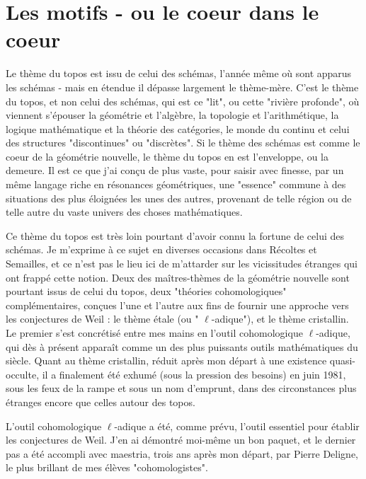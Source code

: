\section{Les motifs - ou le coeur dans le coeur}

Le thème du topos est issu de celui des schémas, l'année même où sont apparus les schémas - mais en étendue il dépasse largement le thème-mère. C'est le thème du topos, et non celui des schémas, qui est ce "lit", ou cette "rivière profonde", où viennent s'épouser la géométrie et l'algèbre, la topologie et l'arithmétique, la logique mathématique et la théorie des catégories, le monde du continu et celui des structures "discontinues" ou "discrètes". Si le thème des schémas est comme le coeur de la géométrie nouvelle, le thème du topos en est l'enveloppe, ou la demeure. Il est ce que j'ai conçu de plus vaste, pour saisir avec finesse, par un même langage riche en résonances géométriques, une "essence" commune à des situations des plus éloignées les unes des autres, provenant de telle région ou de telle autre du vaste univers des choses mathématiques.

Ce thème du topos est très loin pourtant d'avoir connu la fortune de celui des schémas. Je m'exprime à ce sujet en diverses occasions dans Récoltes et Semailles, et ce n'est pas le lieu ici de m'attarder sur les vicissitudes étranges qui ont frappé cette notion. Deux des maîtres-thèmes de la géométrie nouvelle sont pourtant issus de celui du topos, deux "théories cohomologiques" complémentaires, conçues l'une et l'autre aux fins de fournir une approche vers les conjectures de Weil : le thème étale (ou " $\ell$-adique"), et le thème cristallin. Le premier s'est concrétisé entre mes mains en l'outil cohomologique $\ell$-adique, qui dès à présent apparaît comme un des plus puissants outils mathématiques du siècle. Quant au thème cristallin, réduit après mon départ à une existence quasi-occulte, il a finalement été exhumé (sous la pression des besoins) en juin 1981, sous les feux de la rampe et sous un nom d'emprunt, dans des circonstances plus étranges encore que celles autour des topos.

L'outil cohomologique $\ell$-adique a été, comme prévu, l'outil essentiel pour établir les conjectures de Weil. J'en ai démontré moi-même un bon paquet, et le dernier pas a été accompli avec maestria, trois ans après mon départ, par Pierre Deligne, le plus brillant de mes élèves "cohomologistes".

